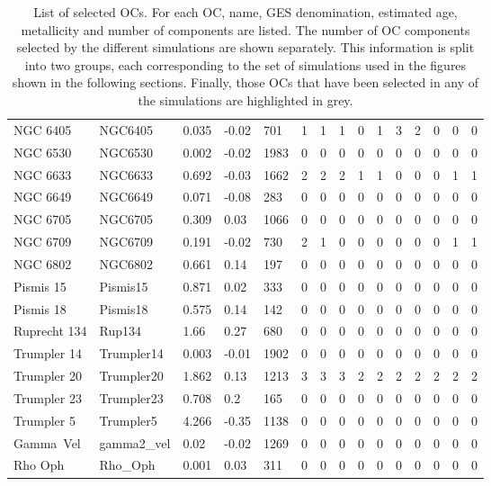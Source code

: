 \documentclass[fleqn,usenatbib]{mnras}
\begin{document}
\begin{table}
\begin{tabular}{|l l l l l || c c c c c | c c c c c|}
            \rowcolor{lightgray}
            NGC 6405 & NGC6405 & 0.035 & -0.02 & 701 & 1 & 1 & 1 & 0 & 1 & 3 & 2 & 0 & 0 & 0\\
            NGC 6530 & NGC6530 & 0.002 & -0.02 & 1983 & 0 & 0 & 0 & 0 & 0 & 0 & 0 & 0 & 0 & 0\\
            \rowcolor{lightgray}
            NGC 6633 & NGC6633 & 0.692 & -0.03 & 1662 & 2 & 2 & 2 & 1 & 1 & 0 & 0 & 0 & 1 & 1\\
            NGC 6649 & NGC6649 & 0.071 & -0.08 & 283 & 0 & 0 & 0 & 0 & 0 & 0 & 0 & 0 & 0 & 0\\
            NGC 6705 & NGC6705 & 0.309 & 0.03 & 1066 & 0 & 0 & 0 & 0 & 0 & 0 & 0 & 0 & 0 & 0\\
            \rowcolor{lightgray}
            NGC 6709 & NGC6709 & 0.191 & -0.02 & 730 & 2 & 1 & 0 & 0 & 0 & 0 & 0 & 0 & 1 & 1\\
            NGC 6802 & NGC6802 & 0.661 & 0.14 & 197 & 0 & 0 & 0 & 0 & 0 & 0 & 0 & 0 & 0 & 0\\
            Pismis 15 & Pismis15 & 0.871 & 0.02 & 333 & 0 & 0 & 0 & 0 & 0 & 0 & 0 & 0 & 0 & 0\\
            Pismis 18 & Pismis18 & 0.575 & 0.14 & 142 & 0 & 0 & 0 & 0 & 0 & 0 & 0 & 0 & 0 & 0\\
            Ruprecht 134 & Rup134 & 1.66 & 0.27 & 680 & 0 & 0 & 0 & 0 & 0 & 0 & 0 & 0 & 0 & 0\\
            Trumpler 14 & Trumpler14 & 0.003 & -0.01 & 1902 & 0 & 0 & 0 & 0 & 0 & 0 & 0 & 0 & 0 & 0\\
            \rowcolor{lightgray}
            Trumpler 20 & Trumpler20 & 1.862 & 0.13 & 1213 & 3 & 3 & 3 & 2 & 2 & 2 & 2 & 2 & 2 & 2\\
            Trumpler 23 & Trumpler23 & 0.708 & 0.2 & 165 & 0 & 0 & 0 & 0 & 0 & 0 & 0 & 0 & 0 & 0\\
            Trumpler 5 & Trumpler5 & 4.266 & -0.35 & 1138 & 0 & 0 & 0 & 0 & 0 & 0 & 0 & 0 & 0 & 0\\
            Gamma Vel & gamma2\_vel & 0.02 & -0.02 & 1269 & 0 & 0 & 0 & 0 & 0 & 0 & 0 & 0 & 0 & 0\\
            Rho Oph & Rho\_Oph & 0.001 & 0.03 & 311 & 0 & 0 & 0 & 0 & 0 & 0 & 0 & 0 & 0 & 0\\           
            \hline
	\end{tabular}
 	\caption{List of selected OCs. For each OC, name, GES denomination, estimated age, metallicity and number of components are listed. The number of OC components selected by the different simulations are shown separately. This information is split into two groups, each corresponding to the set of simulations used in the figures shown in the following sections. Finally, those OCs that have been selected in any of the simulations are highlighted in grey.}
  	\label{tab:oc_list}
\end{table}
\end{document}

